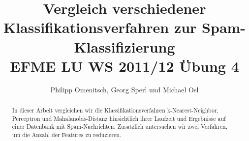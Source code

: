 \documentclass{report}
\begin{document}
\title{Vergleich verschiedener Klassifikationsverfahren zur Spam-Klassifizierung \\ EFME LU WS 2011/12 Übung 4}
\author{Philipp Omenitsch, Georg Sperl und Michael Osl}



\maketitle
\begin{abstract}
In dieser Arbeit vergleichen wir die Klassifikationsverfahren k-Nearest-Neighbor, Perceptron und Mahalanobis-Distanz hinsichtlich ihrer Laufzeit und Ergebnisse auf einer Datenbank mit Spam-Nachrichten. Zusätzlich untersuchen wir zwei Verfahren, um die Anzahl der Features zu reduzieren.
\end{abstract}

\tableofcontents
\clearpage
{}







\end{document}
